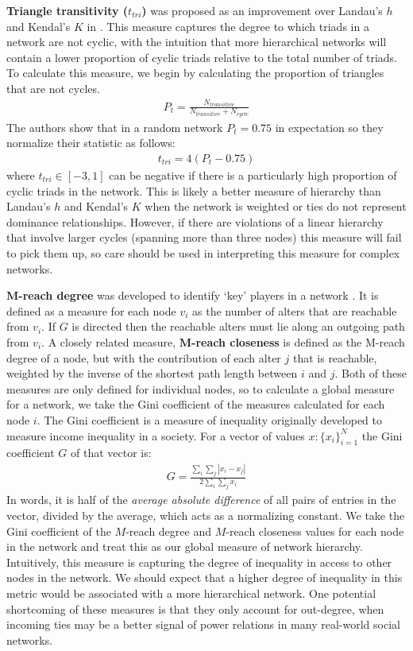 \documentclass[3p,times]{elsarticle}
\begin{document}
\textbf{Triangle transitivity ($t_{tri}$)} was proposed as an improvement over Landau's $h$ and Kendal's $K$ in \cite{Shizuka2012}. This measure captures the degree to which triads in a network are not cyclic, with the intuition that more hierarchical networks will contain a lower proportion of cyclic triads relative to the total number of triads. To calculate this measure, we begin by calculating the proportion of triangles that are not cycles.
\begin{align}
	P_t = \frac{N_{transitive}}{N_{transitive} + N_{cycle}}
\end{align}
The authors show that in a random network $P_t = 0.75$ in expectation so they normalize their statistic as follows:
\begin{align}
	t_{tri} = 4(P_t - 0.75)
\end{align}
where $t_{tri} \in [-3,1]$ can be negative if there is a particularly high proportion of cyclic triads in the network. This is likely a better measure of hierarchy than Landau's $h$ and Kendal's $K$ when the network is weighted or ties do not represent dominance relationships. However, if there are violations of a linear hierarchy that involve larger cycles (spanning more than three nodes) this measure will fail to pick them up, so care should be used in interpreting this measure for complex networks.

\textbf{$\mathbf{M}$-reach degree} was developed to identify `key' players in a network \cite{an2015multilevel}.  It is defined as a measure for each node $v_{i}$ as the number of alters that are reachable from $v_{i}.$ If $G$ is directed then the reachable alters must lie along an outgoing path from $v_{i}$. A closely related measure, \textbf{$\mathbf{M}$-reach closeness} is defined as the M-reach degree of a node, but with the contribution of each alter $j$ that is reachable, weighted by the inverse of the shortest path length between $i$ and $j$. Both of these measures are only defined for individual nodes, so to calculate a global measure for a network, we take the Gini coefficient of the measures calculated for each node $i$. The Gini  coefficient \cite{yitzhaki1979relative} is a measure of inequality originally developed to measure income inequality in a society. For a vector of values $x : \{x_i\}_{i=1}^{N}$ the Gini coefficient $G$ of that vector is:
\begin{align}
	G = \frac{\displaystyle{\sum_i \sum_j \left| x_i - x_j \right|}}{\displaystyle{2 \sum_i \sum_j x_i}}
\end{align}
In words, it is half of the \emph{average absolute difference} of all pairs of entries in the vector, divided by the average, which acts as a normalizing constant. We take the Gini coefficient of the $M$-reach degree and $M$-reach closeness values for each node in the network and treat this as our global measure of network hierarchy. Intuitively, this measure is capturing the degree of inequality in access to other nodes in the network. We should expect that a higher degree of inequality in this metric would be associated with a more hierarchical network. One potential shortcoming of these measures is that they only account for out-degree, when incoming ties may be a better signal of power relations in many real-world social networks.
\end{document}
